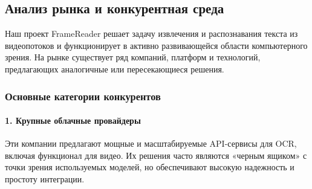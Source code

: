 \documentclass[12pt, a4paper]{article}
\theoremstyle{definition}
\theoremstyle{remark}
\begin{document}
	\subsection{Анализ рынка и конкурентная среда}
	Наш проект FrameReader решает задачу извлечения и распознавания текста из видеопотоков и функционирует в активно развивающейся области компьютерного зрения. На рынке существует ряд компаний, платформ и технологий, предлагающих аналогичные или пересекающиеся решения.
	
	\subsubsection{Основные категории конкурентов}
	
	\paragraph{1. Крупные облачные провайдеры}
	Эти компании предлагают мощные и масштабируемые API-сервисы для OCR, включая функционал для видео. Их решения часто являются «черным ящиком» с точки зрения используемых моделей, но обеспечивают высокую надежность и простоту интеграции.
	
\end{document}

